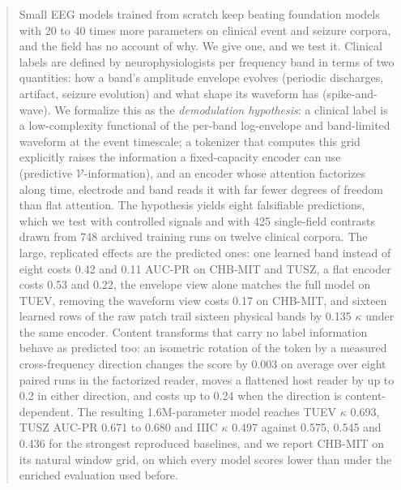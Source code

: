 \begin{abstract}
Small EEG models trained from scratch keep beating foundation models with 20 to 40 times more parameters on clinical event and seizure corpora, and the field has no account of why. We give one, and we test it. Clinical labels are defined by neurophysiologists per frequency band in terms of two quantities: how a band's amplitude envelope evolves (periodic discharges, artifact, seizure evolution) and what shape its waveform has (spike-and-wave). We formalize this as the \emph{demodulation hypothesis}: a clinical label is a low-complexity functional of the per-band log-envelope and band-limited waveform at the event timescale; a tokenizer that computes this grid explicitly raises the information a fixed-capacity encoder can use (predictive $\mathcal{V}$-information), and an encoder whose attention factorizes along time, electrode and band reads it with far fewer degrees of freedom than flat attention. The hypothesis yields eight falsifiable predictions, which we test with controlled signals and with 425 single-field contrasts drawn from 748 archived training runs on twelve clinical corpora. The large, replicated effects are the predicted ones: one learned band instead of eight costs 0.42 and 0.11 AUC-PR on CHB-MIT and TUSZ, a flat encoder costs 0.53 and 0.22, the envelope view alone matches the full model on TUEV, removing the waveform view costs 0.17 on CHB-MIT, and sixteen learned rows of the raw patch trail sixteen physical bands by 0.135 $\kappa$ under the same encoder. Content transforms that carry no label information behave as predicted too: an isometric rotation of the token by a measured cross-frequency direction changes the score by 0.003 on average over eight paired runs in the factorized reader, moves a flattened host reader by up to 0.2 in either direction, and costs up to 0.24 when the direction is content-dependent. The resulting 1.6M-parameter model reaches TUEV $\kappa$ 0.693, TUSZ AUC-PR 0.671 to 0.680 and IIIC $\kappa$ 0.497 against 0.575, 0.545 and 0.436 for the strongest reproduced baselines, and we report CHB-MIT on its natural window grid, on which every model scores lower than under the enriched evaluation used before.
\end{abstract}
